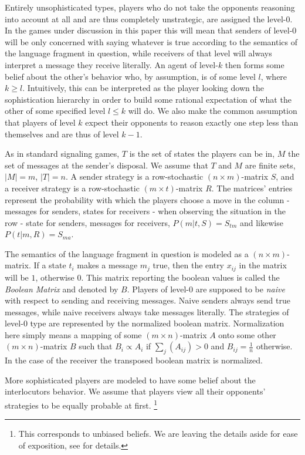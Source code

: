 \documentclass[10pt,a4paper]{article}
\begin{document}
Entirely unsophisticated types, players who do not take the opponents reasoning into account at all and are thus completely unstrategic, are assigned the level-0. In the games under discussion in this paper this will mean that senders of level-0 will be only concerned with saying whatever is true according to the semantics of the language fragment in question, while receivers of that level will always interpret a message they receive literally. An agent of level-$k$ then forms some belief about the other's behavior who, by assumption, is of some level $l$, where $k\geq l$. Intuitively, this can be interpreted as the player looking down the sophistication hierarchy in order to build some rational expectation of what the other of some specified level $l\leq k$ will do. We also make the common assumption that players of level $k$ expect their opponents to reason exactly one step less than themselves and are thus of level $k-1$.

As in standard signaling games, $T$ is the set of states the players can be in, $M$ the set of messages at the sender's disposal. We assume that $T$ and $M$ are finite sets, $|M|=m$, $|T|=n$. A sender strategy is a row-stochastic $(n \times m)$-matrix $S$, and a receiver strategy is a row-stochastic $(m\times t)$-matrix $R$.
The matrices' entries represent the probability with which the players choose a move in the column - messages for senders, states for receivers - when observing the situation in the row - state for senders, messages for receivers, $P(m|t,S) = S_{tm}$ and likewise $P(t|m,R) = S_{ma}$.

The semantics of the language fragment in question is modeled as a $(n \times m)$-matrix. If a state $t_i$ makes a message $m_j$ true, then the entry $x_{ij}$ in the matrix will be $1$, otherwise $0$. This matrix reporting the boolean values is called the \textit{Boolean Matrix} and denoted by $B$.
Players of level-0 are supposed to be \textit{naive} with respect to sending and receiving messages. Naive senders always send true messages, while naive receivers always take messages literally.
The strategies of level-0 type are represented by the normalized boolean matrix. Normalization here simply means a mapping of some $(m\times n)$-matrix $A$ onto some other $(m\times n)$-matrix $B$ such that $B_i\propto A_i$ if $\sum_j (A_{ij})>0$ and $B_{ij}=\tfrac{1}{n}$ otherwise. In the case of the receiver the transposed boolean matrix is normalized.

More sophisticated players are modeled to have some belief about the interlocutors behavior. We assume that players view all their opponents' strategies to be equally probable at first. \footnote{This corresponds to unbiased beliefs. We are leaving the details aside for ease of exposition, see \cite{franke2013pragmatic} for details.}
\end{document}
